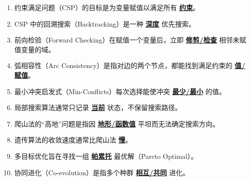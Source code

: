\documentclass[12pt,a4paper,openany]{ctexbook}
\begin{document}
\begin{enumerate}[resume,leftmargin=2em,itemsep=1pt]
\item 约束满足问题（CSP）的目标是为变量赋值以满足所有 \underline{\textbf{约束}}。
\item CSP 中的回溯搜索（Backtracking）是一种 \underline{\textbf{深度}} 优先搜索。
\item 前向检验（Forward Checking）在赋值一个变量后，立即 \underline{\textbf{修剪/检查}} 相邻未赋值变量的域。
\item 弧相容性（Arc Consistency）是指对边的两个节点，都能找到满足约束的 \underline{\textbf{值/赋值}}。
\item 最小冲突启发式（Min-Conflicts）每次选择能使冲突 \underline{\textbf{最少/最小}} 的值。
\item 局部搜索算法通常只记录 \underline{\textbf{当前}} 状态，不保留搜索路径。
\item 爬山法的“高地”问题是指因 \underline{\textbf{地形/函数值}} 平坦而无法确定搜索方向。
\item 遗传算法的收敛速度通常比爬山法 \underline{\textbf{慢}}。
\item 多目标优化旨在寻找一组 \underline{\textbf{帕累托}} 最优解（Pareto Optimal）。
\item 协同进化（Co-evolution）是指多个种群 \underline{\textbf{相互/共同}} 进化。
\end{enumerate}
\end{document}
